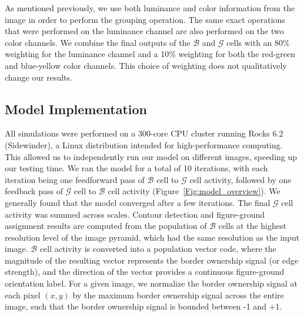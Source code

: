 \documentclass[12pt]{article}
\begin{document}

As mentioned previously, we use both luminance and color information from the image in order to perform the grouping operation. The same exact operations that were performed on the luminance channel are also performed on the two color channels. We combine the final outputs of the $\mathcal{B}$ and $\mathcal{G}$ cells with an 80\% weighting for the luminance channel and a 10\% weighting for both the red-green and blue-yellow color channels. This choice of weighting does not qualitatively change our results.
%
%

\subsection{Model Implementation}
\label{sec:implementation}

All simulations were performed on a 
300-core CPU cluster running Rocks 6.2 (Sidewinder), a Linux
distribution intended for high-performance computing. This allowed us to independently
run our model on different images, speeding up our testing time. We ran the model for a total of 10 iterations, with each iteration being one feedforward pass of $\mathcal{B}$ cell to $\mathcal{G}$ cell activity, followed by one feedback pass of $\mathcal{G}$ cell to $\mathcal{B}$ cell activity (Figure~\ref{Fig:model_overview}). We generally found that the model converged after a few iterations. The final $\mathcal{G}$ cell activity was summed across scales. Contour detection and figure-ground assignment results are computed from the population of $\mathcal{B}$ cells at the highest resolution level of the image pyramid, which had the same resolution as the input image. $\mathcal{B}$ cell activity is converted into a population vector code, where the magnitude of the resulting vector represents the border ownership signal (or edge strength), and the direction of the vector provides a continuous figure-ground orientation label. For a given image, we normalize the border ownership signal at each pixel $(x,y)$ by the maximum border ownership signal across the entire image, such that the border ownership signal is bounded between -1 and +1.
\end{document}
